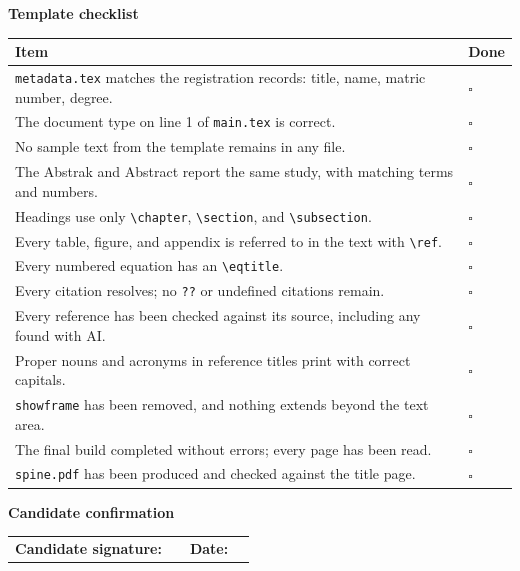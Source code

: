 \documentclass[11pt,a4paper]{article}
\newcommand\cmd[1]{\texttt{\textbackslash #1}}
\newcommand\cbox{$\square$}
\begin{document}
\vspace{8pt}
{\large\bfseries Template checklist\par}\vspace{4pt}
{\small
\begin{tabularx}{\textwidth}{@{}X>{\centering\arraybackslash}p{14mm}@{}}
\toprule
\textbf{Item} & \textbf{Done} \\
\midrule
\texttt{metadata.tex} matches the registration records: title, name, matric number, degree. & \cbox \\
The document type on line 1 of \texttt{main.tex} is correct.                     & \cbox \\
No sample text from the template remains in any file.                            & \cbox \\
The Abstrak and Abstract report the same study, with matching terms and numbers. & \cbox \\
Headings use only \cmd{chapter}, \cmd{section}, and \cmd{subsection}.            & \cbox \\
Every table, figure, and appendix is referred to in the text with \cmd{ref}.     & \cbox \\
Every numbered equation has an \cmd{eqtitle}.                                    & \cbox \\
Every citation resolves; no \texttt{??} or undefined citations remain.           & \cbox \\
Every reference has been checked against its source, including any found with AI. & \cbox \\
Proper nouns and acronyms in reference titles print with correct capitals.       & \cbox \\
\texttt{showframe} has been removed, and nothing extends beyond the text area.   & \cbox \\
The final build completed without errors; every page has been read.              & \cbox \\
\texttt{spine.pdf} has been produced and checked against the title page.         & \cbox \\
\bottomrule
\end{tabularx}}

\vspace{14pt}
{\large\bfseries Candidate confirmation\par}\vspace{8pt}
\begin{tabularx}{\textwidth}{@{}p{44mm}X p{12mm}p{34mm}@{}}
\textbf{Candidate signature:} & \hrulefill & \textbf{Date:} & \hrulefill \\
\end{tabularx}
\restoregeometry
\clearpage
\end{document}
